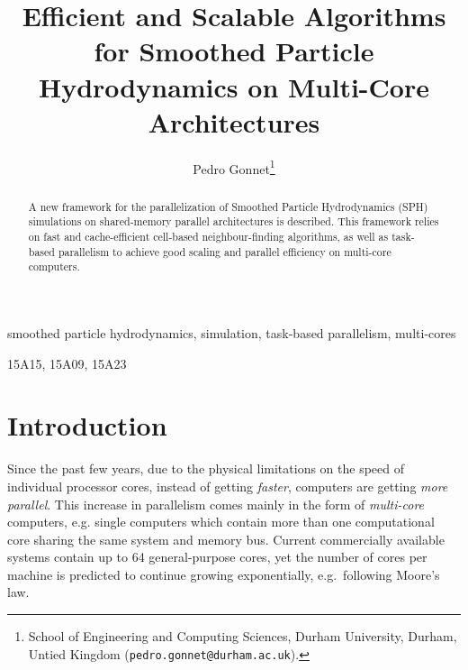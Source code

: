 \documentclass[final]{siamltex}
\date{}
\title{Efficient and Scalable Algorithms for Smoothed Particle Hydrodynamics on Multi-Core
    Architectures}
\author{Pedro Gonnet\thanks{School of Engineering and Computing Sciences,
    Durham University, Durham, Untied Kingdom ({\tt pedro.gonnet@durham.ac.uk}).}}
\begin{document}
\lstset{%
    language=C,
    basicstyle=\small\tt,
    numbers=left,
    numberstyle=\tiny
    }


\maketitle


\begin{abstract}
A new framework for the parallelization of Smoothed Particle Hydrodynamics (SPH)
simulations on shared-memory parallel architectures is described.
This framework relies on fast and cache-efficient cell-based neighbour-finding
algorithms, as well as task-based parallelism to achieve good scaling and
parallel efficiency on multi-core computers.
\end{abstract}


\begin{keywords} 
smoothed particle hydrodynamics,
simulation,
task-based parallelism,
multi-cores
\end{keywords}

\begin{AMS}
15A15, 15A09, 15A23
\end{AMS}

\pagestyle{myheadings}
\thispagestyle{plain}


\section{Introduction}

Since the past few years, due to the physical limitations
on the speed of individual processor cores, instead of
getting {\em faster}, computers are getting {\em more parallel}.
This increase in parallelism comes mainly in the form of
{\em multi-core} computers, e.g. single computers which
contain more than one computational core sharing the 
same system and memory bus.
Current commercially available systems contain up to 64
general-purpose cores, yet the number of cores per
machine is predicted to continue growing exponentially,
e.g.~following Moore's law.
\end{document}
